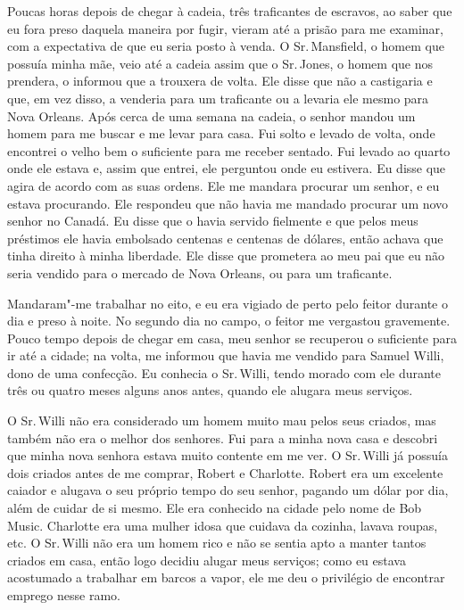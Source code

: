Poucas horas depois de chegar à cadeia, três traficantes de escravos, ao
saber que eu fora preso daquela maneira por fugir, vieram até a prisão
para me examinar, com a expectativa de que eu seria posto à venda. O Sr.\,Mansfield, o homem que possuía minha mãe, veio até a cadeia assim que o
Sr.\,Jones, o homem que nos prendera, o informou que a trouxera de volta.
Ele disse que não a castigaria e que, em vez disso, a venderia para um
traficante ou a levaria ele mesmo para Nova Orleans. Após cerca de uma
semana na cadeia, o senhor mandou um homem para me buscar e me levar
para casa. Fui solto e levado de volta, onde encontrei o velho bem o
suficiente para me receber sentado. Fui levado ao quarto onde ele estava
e, assim que entrei, ele perguntou onde eu estivera. Eu disse que agira
de acordo com as suas ordens. Ele me mandara procurar um senhor, e eu
estava procurando. Ele respondeu que não havia me mandado procurar um
novo senhor no Canadá. Eu disse que o havia servido fielmente e que
pelos meus préstimos ele havia embolsado centenas e centenas de dólares,
então achava que tinha direito à minha liberdade. Ele disse que
prometera ao meu pai que eu não seria vendido para o mercado de Nova
Orleans, ou para um traficante.

Mandaram"-me trabalhar no eito, e eu era vigiado de perto pelo feitor
durante o dia e preso à noite. No segundo dia no campo, o feitor me
vergastou gravemente. Pouco tempo depois de chegar em casa, meu senhor
se recuperou o suficiente para ir até a cidade; na volta, me informou
que havia me vendido para Samuel Willi, dono de uma confecção. Eu
conhecia o Sr.\,Willi, tendo morado com ele durante três ou quatro meses
alguns anos antes, quando ele alugara meus serviços.

O Sr.\,Willi não era considerado um homem muito mau pelos seus criados,
mas também não era o melhor dos senhores. Fui para a minha nova casa e
descobri que minha nova senhora estava muito contente em me ver. O Sr.\,Willi já possuía dois criados antes de me comprar, Robert e Charlotte.
Robert era um excelente caiador e alugava o seu próprio tempo do seu
senhor, pagando um dólar por dia, além de cuidar de si mesmo. Ele era
conhecido na cidade pelo nome de Bob Music. Charlotte era uma mulher
idosa que cuidava da cozinha, lavava roupas, etc. O Sr.\,Willi não era um
homem rico e não se sentia apto a manter tantos criados em casa, então
logo decidiu alugar meus serviços; como eu estava acostumado a trabalhar
em barcos a vapor, ele me deu o privilégio de encontrar emprego nesse
ramo.

